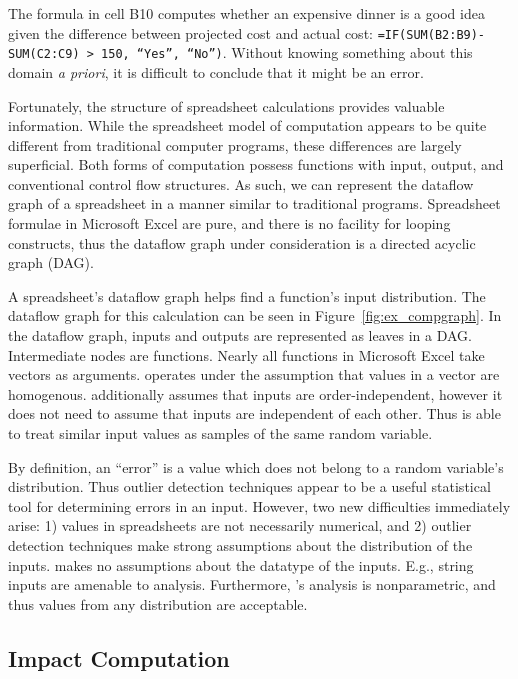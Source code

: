 The formula in cell B10 computes whether an expensive dinner is a good idea given the difference between projected cost and actual cost: \texttt{=IF(SUM(B2:B9)-SUM(C2:C9) > 150, ``Yes'', ``No'')}.  Without knowing something about this domain \emph{a priori}, it is difficult to conclude that it might be an error.

Fortunately, the structure of spreadsheet calculations provides valuable information.  While the spreadsheet model of computation appears to be quite different from traditional computer programs, these differences are largely superficial.  Both forms of computation possess functions with input, output, and conventional control flow structures.  As such, we can represent the dataflow graph of a spreadsheet in a manner similar to traditional programs.  Spreadsheet formulae in Microsoft Excel are pure, and there is no facility for looping constructs, thus the dataflow graph under consideration is a directed acyclic graph (DAG).

A spreadsheet's dataflow graph helps \checkcell find a function's input distribution.  The dataflow graph for this calculation can be seen in Figure~\ref{fig:ex_compgraph}.  In the dataflow graph, inputs and outputs are represented as leaves in a DAG.  Intermediate nodes are functions.  Nearly all functions in Microsoft Excel take vectors as arguments.  \checkcell operates under the assumption that values in a vector are homogenous.  \checkcell additionally assumes that inputs are order-independent, however it does not need to assume that inputs are independent of each other.  Thus \checkcell is able to treat similar input values as samples of the same random variable.

By definition, an ``error'' is a value which does not belong to a random variable's distribution.  Thus outlier detection techniques appear to be a useful statistical tool for determining errors in an input.  However, two new difficulties immediately arise: 1) values in spreadsheets are not necessarily numerical, and 2) outlier detection techniques make strong assumptions about the distribution of the inputs.  \checkcell makes no assumptions about the datatype of the inputs.  E.g., string inputs are amenable to analysis.  Furthermore, \checkcell's analysis is nonparametric, and thus values from any distribution are acceptable.

\subsection{Impact Computation}

